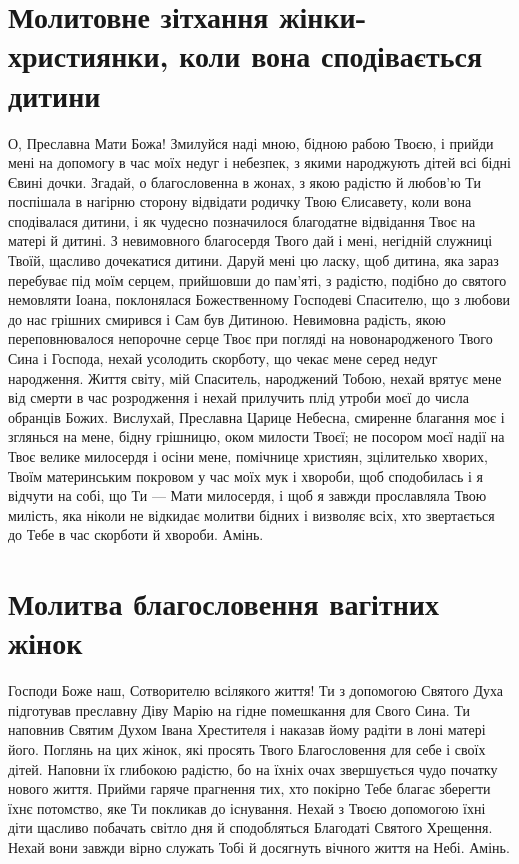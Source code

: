 \documentclass[chapters.tex]{subfiles}
\begin{document}
\section{Молитовне зітхання жінки-християнки, коли вона сподівається дитини}
О, Преславна Мати Божа! Змилуйся наді мною, бідною рабою Твоєю, і прийди мені на допомогу в час моїх недуг і небезпек, з якими народжують дітей всі бідні Євині дочки. Згадай, о благословенна в жонах, з якою радістю й любов’ю Ти поспішала в нагірню сторону відвідати родичку Твою Єлисавету, коли вона сподівалася дитини, і як чудесно позначилося благодатне відвідання Твоє на матері й дитині. З невимовного благосердя Твого дай і мені, негідній служниці Твоїй, щасливо дочекатися дитини. Даруй мені цю ласку, щоб дитина, яка зараз перебуває під моїм серцем, прийшовши до пам’яті, з радістю, подібно до святого немовляти Іоана, поклонялася Божественному Господеві Спасителю, що з любови до нас грішних смирився і Сам був Дитиною. Невимовна радість, якою переповнювалося непорочне серце Твоє при погляді на новонародженого Твого Сина і Господа, нехай усолодить скорботу, що чекає мене серед недуг народження. Життя світу, мій Спаситель, народжений Тобою, нехай врятує мене від смерти в час розродження і нехай прилучить плід утроби моєї до числа обранців Божих. Вислухай, Преславна Царице Небесна, смиренне благання моє і зглянься на мене, бідну грішницю, оком милости Твоєї; не посором моєї надії на Твоє велике милосердя і осіни мене, помічнице християн, зцілителько хворих, Твоїм материнським покровом у час моїх мук і хвороби, щоб сподобилась і я відчути на собі, що Ти — Мати милосердя, і щоб я завжди прославляла Твою милість, яка ніколи не відкидає молитви бідних і визволяє всіх, хто звертається до Тебе в час скорботи й хвороби. Амінь.

\section{Молитва благословення вагітних жінок}
Господи Боже наш, Сотворителю всілякого життя! Ти з допомогою Святого Духа підготував преславну Діву Марію на гідне помешкання для Свого Сина. Ти наповнив Святим Духом Івана Хрестителя і наказав йому радіти в лоні матері його. Поглянь на цих жінок, які просять Твого Благословення для себе і своїх дітей. Наповни їх глибокою радістю, бо на їхніх очах звершується чудо початку нового життя. Прийми гаряче прагнення тих, хто покірно Тебе благає зберегти їхнє потомство, яке Ти покликав до існування. Нехай з Твоєю допомогою їхні діти щасливо побачать світло дня й сподобляться Благодаті Святого Хрещення. Нехай вони завжди вірно служать Тобі й досягнуть вічного життя на Небі. Амінь.
\end{document}
